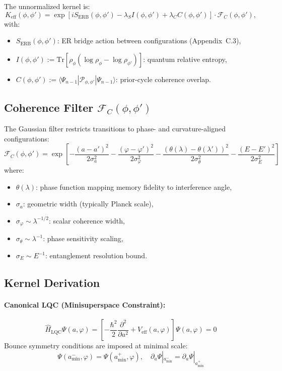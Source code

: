 The unnormalized kernel is:
\begin{equation}
K_{\text{eff}}(\phi, \phi') = \exp\left[i S_{\text{ERB}}(\phi, \phi') - \lambda_S I(\phi, \phi') + \lambda_C C(\phi, \phi') \right] \cdot \mathcal{F}_C(\phi, \phi'),
\end{equation}
with:
\begin{itemize}
    \item \( S_{\text{ERB}}(\phi, \phi') \): ER bridge action between configurations (Appendix~C.3),
    \item \( I(\phi, \phi') := \mathrm{Tr}[\rho_\phi (\log \rho_\phi - \log \rho_{\phi'})] \): quantum relative entropy,
    \item \( C(\phi, \phi') := \langle \Psi_{n-1} | \mathcal{P}_{\phi,\phi'} | \Psi_{n-1} \rangle \): prior-cycle coherence overlap.
\end{itemize}

\subsection{Coherence Filter \( \mathcal{F}_C(\phi,\phi') \)}
\label{subsec:coherence-filter}

The Gaussian filter restricts transitions to phase- and curvature-aligned configurations:
\[
\mathcal{F}_C(\phi, \phi') = \exp\left[
    -\frac{(a - a')^2}{2\sigma_a^2}
    -\frac{(\varphi - \varphi')^2}{2\sigma_\varphi^2}
    -\frac{(\theta(\lambda) - \theta(\lambda'))^2}{2\sigma_\theta^2}
    -\frac{(E - E')^2}{2\sigma_E^2}
\right]
\]
where:
\begin{itemize}
    \item \( \theta(\lambda) \): phase function mapping memory fidelity to interference angle,
    \item \( \sigma_a \): geometric width (typically Planck scale),
    \item \( \sigma_\varphi \sim \lambda^{-1/2} \): scalar coherence width,
    \item \( \sigma_\theta \sim \lambda^{-1} \): phase sensitivity scaling,
    \item \( \sigma_E \sim E^{-1} \): entanglement resolution bound.
\end{itemize}

\subsection{Kernel Derivation}
\label{subsec:kernel-derivation}

\paragraph{Canonical LQC (Minisuperspace Constraint):}
\[
\hat{H}_{\text{LQC}}\Psi(a,\varphi) = \left[
    -\frac{\hbar^2}{2}\frac{\partial^2}{\partial a^2} + V_{\text{eff}}(a,\varphi)
\right]\Psi(a,\varphi) = 0
\]
Bounce symmetry conditions are imposed at minimal scale:
\[
\Psi(a_{\text{min}}^-, \varphi) = \Psi(a_{\text{min}}^+, \varphi), \quad
\partial_a\Psi|_{a_{\text{min}}^-} = \partial_a\Psi|_{a_{\text{min}}^+}
\]

